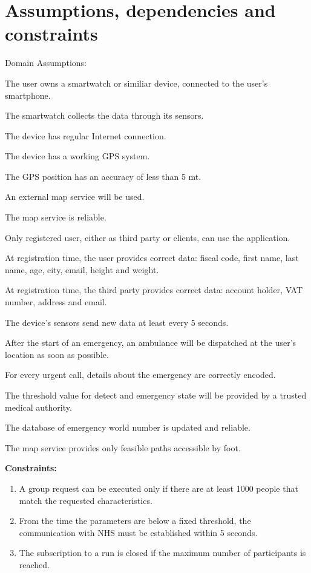\section{Assumptions, dependencies and constraints}
Domain Assumptions:
\begin{enumerate}[label={[}D.\arabic*{]}]

\item \label{d:1}
The user owns a smartwatch or similiar device, connected to the user’s smartphone.
\item\label{d:2}
The smartwatch collects the data through its sensors.
\item\label{d:3}
The device has regular Internet connection.
\item\label{d:4}
The device has a working GPS system.
\item\label{d:4}
The GPS position has an accuracy of less than 5 mt.
\item\label{d:5}
An external map service will be used.
\item\label{d:6}
The map service is reliable.
\item\label{d:7}
Only registered user, either as third party or clients, can use the application.
\item\label{d:8}
At registration time, the user provides correct data: fiscal code, first name, last name, age, city, email, height and weight.
\item\label{d:08}
At registration time, the third party provides correct data: account holder, VAT number, address and email.
\item\label{d:9}
The device’s sensors send new data at least every 5 seconds.
\item\label{d:10}
After the start of an emergency, an ambulance will be dispatched at the user’s location as soon as possible.
\item\label{d:11}
For every urgent call, details about the emergency are correctly encoded.
\item\label{d:12}
The threshold value for detect and emergency state will be provided by a trusted medical authority.
\item\label{d:13}
The database of emergency world number is updated and reliable.
\item\label{d:14}
The map service provides only feasible paths accessible by foot.
\end{enumerate}

\textbf{Constraints:}

\begin{enumerate}
    \item\label{c:1}	A group request can be executed only if there are at least 1000 people that match the requested characteristics.
    \item\label{c:2}
    From the time the parameters are below a fixed threshold, the communication with NHS must be established within 5 seconds.
    \item\label{c:3}
    The subscription to a run is closed if the maximum number of participants is reached.
\end{enumerate}



